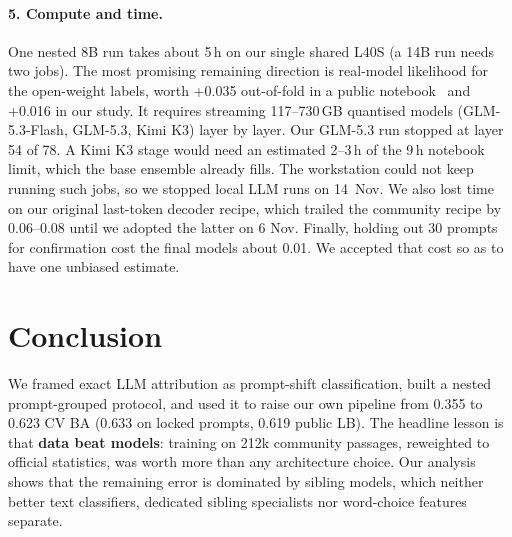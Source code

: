 \documentclass[10pt,twocolumn,letterpaper]{article}
\begin{document}
\paragraph{5. Compute and time.} One nested 8B run takes about 5\,h on our single shared L40S (a 14B run needs two jobs). The most promising remaining direction is real-model likelihood for the open-weight labels, worth +0.035 out-of-fold in a public notebook~\cite{kaggle_glm} and +0.016 in our study. It requires streaming 117--730\,GB quantised models (GLM-5.3-Flash, GLM-5.3, Kimi K3) layer by layer. Our GLM-5.3 run stopped at layer 54 of 78. A Kimi K3 stage would need an estimated 2--3\,h of the 9\,h notebook limit, which the base ensemble already fills. The workstation could not keep running such jobs, so we stopped local LLM runs on 14~Nov. We also lost time on our original last-token decoder recipe, which trailed the community recipe by 0.06--0.08 until we adopted the latter on 6 Nov. Finally, holding out 30 prompts for confirmation cost the final models about 0.01. We accepted that cost so as to have one unbiased estimate.

\section{Conclusion}
\label{sec:conclusion}

We framed exact LLM attribution as prompt-shift classification, built a nested prompt-grouped protocol, and used it to raise our own pipeline from 0.355 to 0.623 CV BA (0.633 on locked prompts, 0.619 public LB). The headline lesson is that \textbf{data beat models}: training on 212k community passages, reweighted to official statistics, was worth more than any architecture choice. Our analysis shows that the remaining error is dominated by sibling models, which neither better text classifiers, dedicated sibling specialists nor word-choice features separate.
\end{document}
